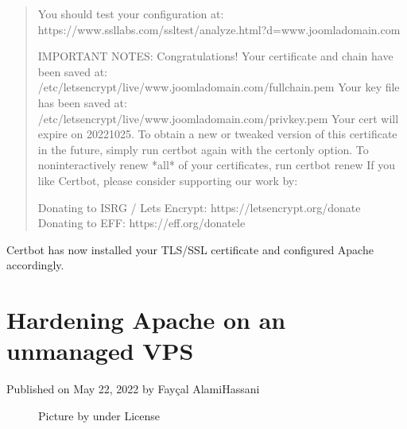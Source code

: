 \documentclass[letterpaper,10pt,english]{sphinxmanual}
\begin{document}
\begin{enumerate}
\begin{quote}
\begin{sphinxVerbatim}[commandchars=\\\{\}]
You should test your configuration at:
https://www.ssllabs.com/ssltest/analyze.html?d=www.joomla\PYGZhy{}domain.com
\PYGZhy{} \PYGZhy{} \PYGZhy{} \PYGZhy{} \PYGZhy{} \PYGZhy{} \PYGZhy{} \PYGZhy{} \PYGZhy{} \PYGZhy{} \PYGZhy{} \PYGZhy{} \PYGZhy{} \PYGZhy{} \PYGZhy{} \PYGZhy{} \PYGZhy{} \PYGZhy{} \PYGZhy{} \PYGZhy{} \PYGZhy{} \PYGZhy{} \PYGZhy{} \PYGZhy{} \PYGZhy{} \PYGZhy{} \PYGZhy{} \PYGZhy{} \PYGZhy{} \PYGZhy{} \PYGZhy{} \PYGZhy{} \PYGZhy{} \PYGZhy{} \PYGZhy{} \PYGZhy{} \PYGZhy{} \PYGZhy{} \PYGZhy{} \PYGZhy{}

IMPORTANT NOTES:
 \PYGZhy{} Congratulations! Your certificate and chain have been saved at:
   /etc/letsencrypt/live/www.joomla\PYGZhy{}domain.com/fullchain.pem
   Your key file has been saved at:
   /etc/letsencrypt/live/www.joomla\PYGZhy{}domain.com/privkey.pem
   Your cert will expire on 2022\PYGZhy{}10\PYGZhy{}25. To obtain a new or tweaked
   version of this certificate in the future, simply run certbot again
   with the \PYGZdq{}certonly\PYGZdq{} option. To non\PYGZhy{}interactively renew *all* of
   your certificates, run \PYGZdq{}certbot renew\PYGZdq{}
 \PYGZhy{} If you like Certbot, please consider supporting our work by:

   Donating to ISRG / Let\PYGZsq{}s Encrypt:   https://letsencrypt.org/donate
   Donating to EFF:                    https://eff.org/donate\PYGZhy{}le
\end{sphinxVerbatim}
\end{quote}

\end{enumerate}

\sphinxAtStartPar
Certbot has now installed your TLS/SSL certificate and configured Apache accordingly.

\sphinxstepscope


\chapter{Hardening Apache on an unmanaged VPS}
\label{\detokenize{hardening-apache:hardening-apache-on-an-unmanaged-vps}}\label{\detokenize{hardening-apache::doc}}
\sphinxAtStartPar
Published on May 22, 2022 by Fayçal Alami\sphinxhyphen{}Hassani 

\begin{figure}[htbp]
\centering
\capstart

\noindent{}
\caption{Picture by  under  License}\label{\detokenize{hardening-apache:id1}}\end{figure}
\end{document}
